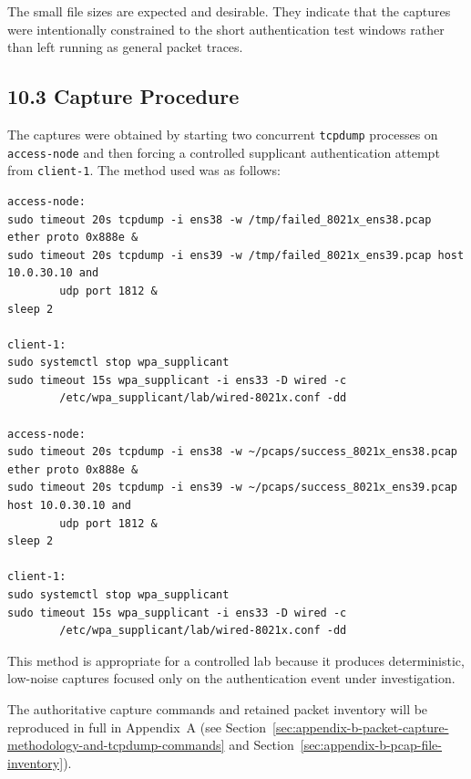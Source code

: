\documentclass[11pt]{article}
\begin{document}
The small file sizes are expected and desirable. They indicate that the captures were intentionally constrained to the short authentication test windows rather than left running as general packet traces.


\subsection{10.3 Capture Procedure}
\label{sec:capture-procedure}

The captures were obtained by starting two concurrent \texttt{tcpdump} processes on \texttt{access-node} and then forcing a controlled supplicant authentication attempt from \texttt{client-1}. The method used was as follows:

\begin{verbatim}
access-node:
sudo timeout 20s tcpdump -i ens38 -w /tmp/failed_8021x_ens38.pcap ether proto 0x888e &
sudo timeout 20s tcpdump -i ens39 -w /tmp/failed_8021x_ens39.pcap host 10.0.30.10 and 
        udp port 1812 &
sleep 2

client-1:
sudo systemctl stop wpa_supplicant
sudo timeout 15s wpa_supplicant -i ens33 -D wired -c 
        /etc/wpa_supplicant/lab/wired-8021x.conf -dd

access-node:
sudo timeout 20s tcpdump -i ens38 -w ~/pcaps/success_8021x_ens38.pcap ether proto 0x888e &
sudo timeout 20s tcpdump -i ens39 -w ~/pcaps/success_8021x_ens39.pcap host 10.0.30.10 and
        udp port 1812 &
sleep 2

client-1:
sudo systemctl stop wpa_supplicant
sudo timeout 15s wpa_supplicant -i ens33 -D wired -c 
        /etc/wpa_supplicant/lab/wired-8021x.conf -dd
\end{verbatim}

This method is appropriate for a controlled lab because it produces deterministic, low-noise captures focused only on the authentication event under investigation.

The authoritative capture commands and retained packet inventory will be reproduced in full in Appendix~A (see Section~\ref{sec:appendix-b-packet-capture-methodology-and-tcpdump-commands} and Section~\ref{sec:appendix-b-pcap-file-inventory}).
\end{document}
